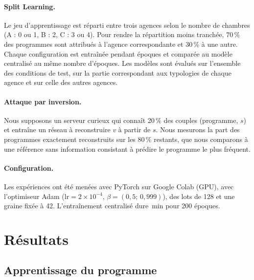 \documentclass[twocolumn]{ICCKjournal}
\begin{document}
\paragraph{Split Learning.}
Le jeu d'apprentissage est réparti entre trois agences selon le nombre
de chambres (A : 0 ou 1, B : 2, C : 3 ou 4). Pour rendre la répartition
moins tranchée, 70\,\% des programmes sont attribués à l'agence
correspondante et 30\,\% à une autre. Chaque configuration est entraînée
pendant \resSlEpochs{} époques et comparée au modèle centralisé au même
nombre d'époques. Les modèles sont évalués sur l'ensemble des conditions
de test, sur la partie correspondant aux typologies de chaque agence et
sur celle des autres agences.

\paragraph{Attaque par inversion.}
Nous supposons un serveur curieux qui connaît 20\,\% des couples
(programme, $s$) et entraîne un réseau à reconstruire $v$ à partir de
$s$. Nous mesurons la part des programmes exactement reconstruits sur
les 80\,\% restants, que nous comparons à une référence sans information
consistant à prédire le programme le plus fréquent.

\paragraph{Configuration.}
Les expériences ont été menées avec PyTorch sur Google Colab (GPU), avec
l'optimiseur Adam ($\text{lr}=2\times10^{-4}$, $\beta=(0{,}5;\,0{,}999)$),
des lots de 128 et une graine fixée à 42. L'entraînement centralisé dure
\resTrainMinutes{}\,min pour 200 époques.


\section{Résultats}

\subsection{Apprentissage du programme}
\end{document}
